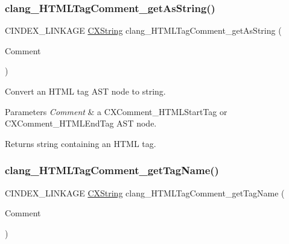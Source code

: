 \subsubsection{\texorpdfstring{clang\+\_\+\+H\+T\+M\+L\+Tag\+Comment\+\_\+get\+As\+String()}{clang\_HTMLTagComment\_getAsString()}}
{\footnotesize\ttfamily C\+I\+N\+D\+E\+X\+\_\+\+L\+I\+N\+K\+A\+GE \mbox{\hyperlink{structCXString}{C\+X\+String}} clang\+\_\+\+H\+T\+M\+L\+Tag\+Comment\+\_\+get\+As\+String (\begin{DoxyParamCaption}\item[{\mbox{\hyperlink{structCXComment}{C\+X\+Comment}}}]{Comment }\end{DoxyParamCaption})}



Convert an H\+T\+ML tag A\+ST node to string. 


\begin{DoxyParams}{Parameters}
{\em Comment} & a {\ttfamily C\+X\+Comment\+\_\+\+H\+T\+M\+L\+Start\+Tag} or {\ttfamily C\+X\+Comment\+\_\+\+H\+T\+M\+L\+End\+Tag} A\+ST node.\\
\hline
\end{DoxyParams}
\begin{DoxyReturn}{Returns}
string containing an H\+T\+ML tag. 
\end{DoxyReturn}
\mbox{\label{group__CINDEX__COMMENT_ga55b84483c67c0629260b1534d4b3f80e}} 
\subsubsection{\texorpdfstring{clang\+\_\+\+H\+T\+M\+L\+Tag\+Comment\+\_\+get\+Tag\+Name()}{clang\_HTMLTagComment\_getTagName()}}
{\footnotesize\ttfamily C\+I\+N\+D\+E\+X\+\_\+\+L\+I\+N\+K\+A\+GE \mbox{\hyperlink{structCXString}{C\+X\+String}} clang\+\_\+\+H\+T\+M\+L\+Tag\+Comment\+\_\+get\+Tag\+Name (\begin{DoxyParamCaption}\item[{\mbox{\hyperlink{structCXComment}{C\+X\+Comment}}}]{Comment }\end{DoxyParamCaption})}


